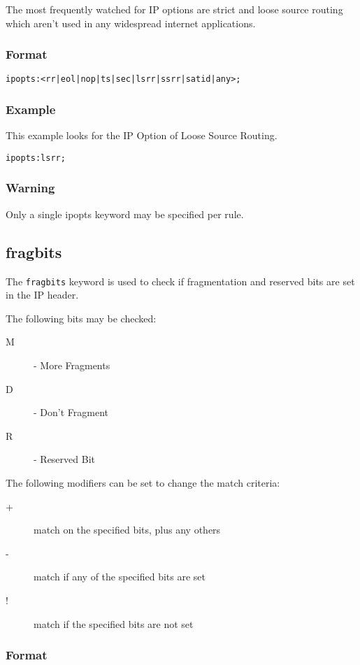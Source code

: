 \documentclass[english]{report}
\begin{document}
The most frequently watched for IP options are strict and loose source
routing which aren't used in any widespread internet applications.


\subsubsection{Format}

\begin{verbatim}
ipopts:<rr|eol|nop|ts|sec|lsrr|ssrr|satid|any>;
\end{verbatim}

\subsubsection{Example}
This example looks for the IP Option of Loose Source Routing.
\begin{verbatim}
ipopts:lsrr;
\end{verbatim}

\subsubsection{Warning}
Only a single ipopts keyword may be specified per rule.

\subsection{fragbits}

The \texttt{fragbits} keyword is used to check if fragmentation and reserved bits are set in the IP header.

The following bits may be checked:
\begin{description}
\item [M] - More Fragments
\item [D] - Don't Fragment
\item [R] - Reserved Bit
\end{description}

The following modifiers can be set to change the match criteria:
\begin{description}
\item [+] match on the specified bits, plus any others
\item [-] match if any of the specified bits are set
\item [!] match if the specified bits are not set
\end{description}

\subsubsection{Format}
\end{document}
